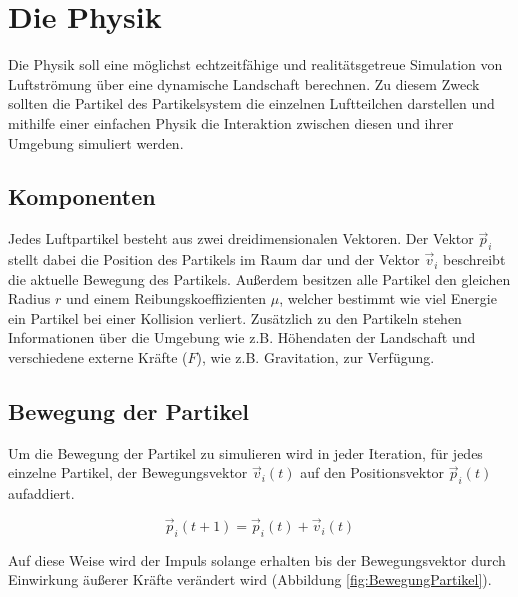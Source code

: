\section{Die Physik}
\begin{Spacing}{\mylinespace}
    Die Physik soll eine möglichst echtzeitfähige und
    realitätsgetreue Simulation von Luftströmung über eine dynamische Landschaft berechnen.
    Zu diesem Zweck sollten die Partikel des Partikelsystem die einzelnen
    Luftteilchen darstellen und mithilfe einer einfachen Physik
    die Interaktion zwischen diesen und ihrer Umgebung simuliert werden.
    \subsection{Komponenten}
        Jedes Luftpartikel besteht aus zwei dreidimensionalen Vektoren.
        Der Vektor $\vec{p}_{i}$ stellt dabei die Position des Partikels im
        Raum dar und der Vektor $\vec{v}_{i}$ beschreibt die aktuelle Bewegung des Partikels.
        Außerdem besitzen alle Partikel den gleichen Radius $r$ und einem
        Reibungskoeffizienten $\mu$, welcher bestimmt wie viel Energie ein Partikel
        bei einer Kollision verliert.
        Zusätzlich zu den Partikeln stehen Informationen über die Umgebung
        wie z.B. Höhendaten der Landschaft und verschiedene externe
        Kräfte ($F$), wie z.B. Gravitation, zur Verfügung.



    \subsection{Bewegung der Partikel}
        Um die Bewegung der Partikel zu simulieren wird in jeder Iteration,
        für jedes einzelne Partikel, der Bewegungsvektor $\vec{v}_{i}(t)$
        auf den Positionsvektor $ \vec{p}_{i}(t) $ aufaddiert.

        \[ \vec{p}_{i}(t+1) = \vec{p}_{i}(t) + \vec{v}_{i}(t) \]

        Auf diese Weise wird der Impuls solange erhalten bis der Bewegungsvektor
        durch Einwirkung äußerer Kräfte verändert wird (Abbildung \ref{fig:BewegungPartikel}).


\end{Spacing}
